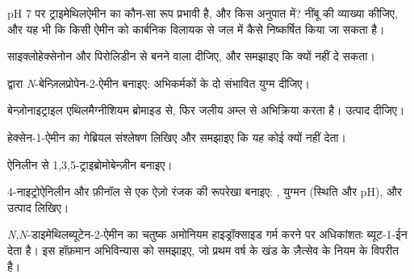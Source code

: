\begin{exercise}[$\star\star$]\label{exo:b2:amines:5}
pH 7 पर ट्राइमेथिलऐमीन का कौन-सा रूप प्रभावी है, और किस अनुपात में? नींबू की व्याख्या कीजिए, और यह भी कि किसी
ऐमीन को कार्बनिक विलायक से जल में कैसे निष्कर्षित किया जा सकता है।
\end{exercise}

\begin{exercise}[$\star\star$]\label{exo:b2:amines:6}
साइक्लोहेक्सेनोन और पिरोलिडीन से बनने वाला  दीजिए, और समझाइए कि 
 क्यों नहीं दे सकता।
\end{exercise}

\begin{exercise}[$\star\star$]\label{exo:b2:amines:7}
 द्वारा \textit{N}-बेन्ज़िलप्रोपेन-2-ऐमीन  बनाइए: अभिकर्मकों के दो
संभावित युग्म दीजिए।
\end{exercise}

\begin{exercise}[$\star\star$]\label{exo:b2:amines:8}
बेन्ज़ोनाइट्राइल एथिलमैग्नीशियम ब्रोमाइड से, फिर जलीय अम्ल से अभिक्रिया करता है। उत्पाद दीजिए।
\end{exercise}

\begin{exercise}[$\star\star$]\label{exo:b2:amines:9}
हेक्सेन-1-ऐमीन का गेब्रियल संश्लेषण लिखिए और समझाइए कि यह कोई  क्यों नहीं देता।
\end{exercise}

\begin{exercise}[$\star\star\star$]\label{exo:b2:amines:10}
ऐनिलीन से 1,3,5-ट्राइब्रोमोबेन्ज़ीन बनाइए।
\end{exercise}

\begin{exercise}[$\star\star\star$]\label{exo:b2:amines:11}
4-नाइट्रोऐनिलीन और फ़ीनॉल से एक ऐज़ो रंजक की रूपरेखा बनाइए: , युग्मन (स्थिति
और pH), और उत्पाद लिखिए।
\end{exercise}

\begin{exercise}[$\star\star\star$]\label{exo:b2:amines:12}
\textit{N},\textit{N}-डाइमेथिलब्यूटेन-2-ऐमीन का चतुष्क अमोनियम हाइड्रॉक्साइड गर्म करने पर
अधिकांशतः ब्यूट-1-ईन देता है। इस हॉफ़मान अभिविन्यास को समझाइए, जो प्रथम वर्ष के
खंड के ज़ैत्सेव के नियम के विपरीत है।
\end{exercise}

